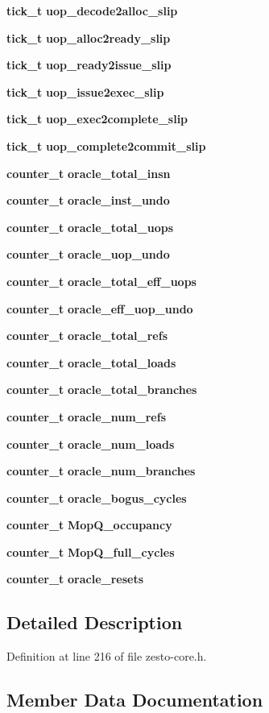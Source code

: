 \begin{CompactItemize}
{\bf tick\_\-t} {\bf uop\_\-decode2alloc\_\-slip}
\item 
{\bf tick\_\-t} {\bf uop\_\-alloc2ready\_\-slip}
\item 
{\bf tick\_\-t} {\bf uop\_\-ready2issue\_\-slip}
\item 
{\bf tick\_\-t} {\bf uop\_\-issue2exec\_\-slip}
\item 
{\bf tick\_\-t} {\bf uop\_\-exec2complete\_\-slip}
\item 
{\bf tick\_\-t} {\bf uop\_\-complete2commit\_\-slip}
\item 
{\bf counter\_\-t} {\bf oracle\_\-total\_\-insn}
\item 
{\bf counter\_\-t} {\bf oracle\_\-inst\_\-undo}
\item 
{\bf counter\_\-t} {\bf oracle\_\-total\_\-uops}
\item 
{\bf counter\_\-t} {\bf oracle\_\-uop\_\-undo}
\item 
{\bf counter\_\-t} {\bf oracle\_\-total\_\-eff\_\-uops}
\item 
{\bf counter\_\-t} {\bf oracle\_\-eff\_\-uop\_\-undo}
\item 
{\bf counter\_\-t} {\bf oracle\_\-total\_\-refs}
\item 
{\bf counter\_\-t} {\bf oracle\_\-total\_\-loads}
\item 
{\bf counter\_\-t} {\bf oracle\_\-total\_\-branches}
\item 
{\bf counter\_\-t} {\bf oracle\_\-num\_\-refs}
\item 
{\bf counter\_\-t} {\bf oracle\_\-num\_\-loads}
\item 
{\bf counter\_\-t} {\bf oracle\_\-num\_\-branches}
\item 
{\bf counter\_\-t} {\bf oracle\_\-bogus\_\-cycles}
\item 
{\bf counter\_\-t} {\bf MopQ\_\-occupancy}
\item 
{\bf counter\_\-t} {\bf MopQ\_\-full\_\-cycles}
\item 
{\bf counter\_\-t} {\bf oracle\_\-resets}
\end{CompactItemize}


\subsection{Detailed Description}


Definition at line 216 of file zesto-core.h.

\subsection{Member Data Documentation}
